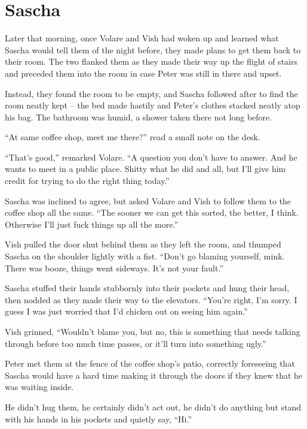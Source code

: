 \chapter{Sascha}

Later that morning, once Volare and Vish had woken up and learned what Sascha would tell them of the night before, they made plans to get them back to their room. The two flanked them as they made their way up the flight of stairs and preceded them into the room in case Peter was still in there and upset.

Instead, they found the room to be empty, and Sascha followed after to find the room neatly kept -- the bed made hastily and Peter's clothes stacked neatly atop his bag. The bathroom was humid, a shower taken there not long before.

``At same coffee shop, meet me there?'' read a small note on the desk.

``That's good,'' remarked Volare. ``A question you don't have to answer. And he wants to meet in a public place. Shitty what he did and all, but I'll give him credit for trying to do the right thing today.''

Sascha was inclined to agree, but asked Volare and Vish to follow them to the coffee shop all the same. ``The sooner we can get this sorted, the better, I think. Otherwise I'll just fuck things up all the more.''

Vish pulled the door shut behind them as they left the room, and thumped Sascha on the shoulder lightly with a fist. ``Don't go blaming yourself, mink. There was booze, things went sideways.  It's not your fault.''

Sascha stuffed their hands stubbornly into their pockets and hung their head, then nodded as they made their way to the elevators. ``You're right, I'm sorry. I guess I was just worried that I'd chicken out on seeing him again.''

Vish grinned, ``Wouldn't blame you, but no, this is something that needs talking through before too much time passes, or it'll turn into something ugly.''

\secdiv

Peter met them at the fence of the coffee shop's patio, correctly foreseeing that Sascha would have a hard time making it through the doors if they knew that he was waiting inside.

He didn't hug them, he certainly didn't act out, he didn't do anything but stand with his hands in his pockets and quietly say, ``Hi.''

